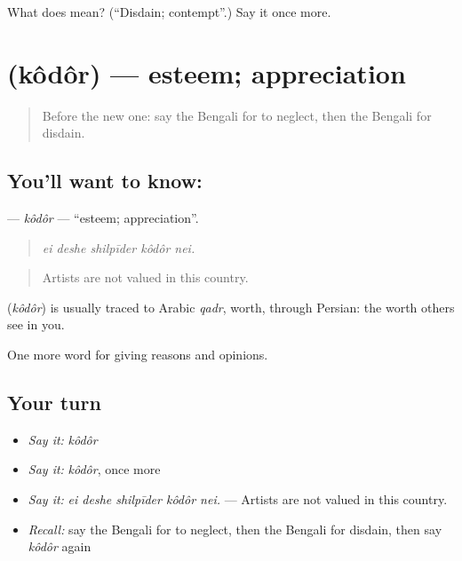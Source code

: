 \begin{tcolorbox}[breakable,colback=teal!4,colframe=teal!35!black,title={Before you move on}]
What does  mean? (\textquotedblleft{}Disdain; contempt\textquotedblright{}.) Say it once more.
\end{tcolorbox}
\section[\texorpdfstring{\bn{কদর} (kôdôr)}{কদর (kôdôr)}]{ (kôdôr) — esteem; appreciation}

\label{lesson:BN-C351-kodor}



\begin{quote}
Before the new one: say the Bengali for to neglect, then the Bengali for disdain.
\end{quote}

\subsection*{You'll want to know: }
\textbf{} — \emph{kôdôr} — \textquotedblleft{}esteem; appreciation\textquotedblright{}.

\begin{quote}
    
\end{quote}

\begin{quote}
\emph{ei deshe shilpīder kôdôr nei.}
\end{quote}

\begin{quote}
Artists are not valued in this country.
\end{quote}

\begin{cousinweb}
\textbf{} (\emph{kôdôr}) is usually traced to Arabic \emph{qadr}, worth, through Persian: the worth others see in you.
\end{cousinweb}

\begin{grammarlens}[title={What you've built}]
One more word for giving reasons and opinions.
\end{grammarlens}

\subsection*{Your turn}
\begin{itemize}
\raggedright
  \item \emph{Say it:} \emph{kôdôr}
  \item \emph{Say it:} \emph{kôdôr}, once more
  \item \emph{Say it:} \emph{ei deshe shilpīder kôdôr nei.} — Artists are not valued in this country.
  \item \emph{Recall:} say the Bengali for to neglect, then the Bengali for disdain, then say \emph{kôdôr} again
\end{itemize}

